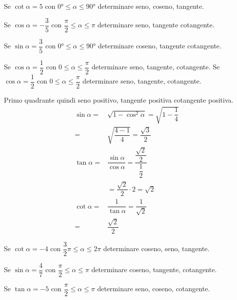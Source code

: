 \begin{exercise}[no solution]
	Se $\cot\alpha=5$ con $\ang{0}\leq\alpha\leq\ang{90}$ determinare seno, coseno, tangente.
\end{exercise}
\begin{exercise}[no solution]
	Se $\cos\alpha=-\dfrac{3}{5}$ con $\dfrac{\pi}{2}\leq\alpha\leq\pi$ determinare seno, tangente cotangente.
\end{exercise}
\begin{exercise}[no solution]
	Se $\sin\alpha=\dfrac{3}{5}$ con $\ang{0}\leq\alpha\leq\ang{90}$ determinare coseno, tangente cotangente.
\end{exercise}
\begin{exercise}
	Se $\cos\alpha=\dfrac{1}{2}$ con $0\leq\alpha\leq\dfrac{\pi}{2}$ determinare seno, tangente, cotangente.
\tcblower	
	Se $\cos\alpha=\dfrac{1}{2}$ con $0\leq\alpha\leq\dfrac{\pi}{2}$ determinare seno, tangente, cotangente.
	
Primo quadrante quindi seno positivo, tangente positiva cotangente positiva.
\begin{align*}
\sin\alpha=&\sqrt{1-\cos^2\alpha}=\sqrt{1-\dfrac{1}{4}}\\
=&\sqrt{\dfrac{4-1}{4}}=\dfrac{\sqrt{3}}{2}\\
\tan\alpha=&\dfrac{\sin\alpha}{\cos\alpha}=\dfrac{\dfrac{\sqrt{2}}{2}}{\dfrac{1}{2}}\\
&=\dfrac{\sqrt{2}}{2}\cdot 2=\sqrt{2}\\
\cot\alpha=&\dfrac{1}{\tan\alpha}=\dfrac{1}{\sqrt{2}}\\
=&\dfrac{\sqrt{2}}{2}
\end{align*}	
\end{exercise}
\begin{exercise}[no solution]
	Se $\cot\alpha=-4$ con $\dfrac{3}{2}\pi\leq\alpha\leq 2\pi$ determinare coseno, seno, tangente.
\end{exercise}
\begin{exercise}[no solution]
	Se $\sin\alpha=\dfrac{4}{7}$ con $\dfrac{\pi}{2}\leq\alpha\leq\pi$ determinare  coseno, tangente, cotangente.
\end{exercise}
\begin{exercise}[no solution]
	Se $\tan\alpha=-5$ con $\dfrac{\pi}{2}\leq\alpha\leq\pi$ determinare seno, coseno, cotangente.
\end{exercise}
